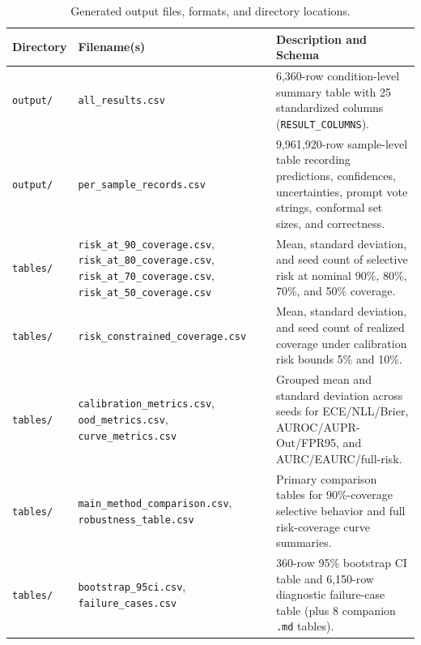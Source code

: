 \documentclass[11pt,a4paper]{article}
\begin{document}
\begin{table}[!htbp]
\centering
\caption{Generated output files, formats, and directory locations.}
\label{tab:outputs}
\begin{tabularx}{\textwidth}{L{0.16\textwidth} L{0.28\textwidth} Y}
\toprule
\textbf{Directory} & \textbf{Filename(s)} & \textbf{Description and Schema} \\
\midrule
\texttt{output/\allowbreak{}} & \texttt{all\_\allowbreak{}results.\allowbreak{}csv} & 6,360-row condition-level summary table with 25 standardized columns (\texttt{RESULT\_\allowbreak{}COLUMNS}). \\
\texttt{output/\allowbreak{}} & \texttt{per\_\allowbreak{}sample\_\allowbreak{}records.\allowbreak{}csv} & 9,961,920-row sample-level table recording predictions, confidences, uncertainties, prompt vote strings, conformal set sizes, and correctness. \\
\texttt{tables/\allowbreak{}} & \texttt{risk\_\allowbreak{}at\_\allowbreak{}90\_\allowbreak{}coverage.\allowbreak{}csv}, \texttt{risk\_\allowbreak{}at\_\allowbreak{}80\_\allowbreak{}coverage.\allowbreak{}csv}, \texttt{risk\_\allowbreak{}at\_\allowbreak{}70\_\allowbreak{}coverage.\allowbreak{}csv}, \texttt{risk\_\allowbreak{}at\_\allowbreak{}50\_\allowbreak{}coverage.\allowbreak{}csv} & Mean, standard deviation, and seed count of selective risk at nominal 90\%, 80\%, 70\%, and 50\% coverage. \\
\texttt{tables/\allowbreak{}} & \texttt{risk\_\allowbreak{}constrained\_\allowbreak{}coverage.\allowbreak{}csv} & Mean, standard deviation, and seed count of realized coverage under calibration risk bounds 5\% and 10\%. \\
\texttt{tables/\allowbreak{}} & \texttt{calibration\_\allowbreak{}metrics.\allowbreak{}csv}, \texttt{ood\_\allowbreak{}metrics.\allowbreak{}csv}, \texttt{curve\_\allowbreak{}metrics.\allowbreak{}csv} & Grouped mean and standard deviation across seeds for ECE/NLL/Brier, AUROC/AUPR-Out/FPR95, and AURC/EAURC/full-risk. \\
\texttt{tables/\allowbreak{}} & \texttt{main\_\allowbreak{}method\_\allowbreak{}comparison.\allowbreak{}csv}, \texttt{robustness\_\allowbreak{}table.\allowbreak{}csv} & Primary comparison tables for 90\%-coverage selective behavior and full risk-coverage curve summaries. \\
\texttt{tables/\allowbreak{}} & \texttt{bootstrap\_\allowbreak{}95ci.\allowbreak{}csv}, \texttt{failure\_\allowbreak{}cases.\allowbreak{}csv} & 360-row 95\% bootstrap CI table and 6,150-row diagnostic failure-case table (plus 8 companion \texttt{.\allowbreak{}md} tables). \\

\end{tabularx}
\end{table}
\end{document}
